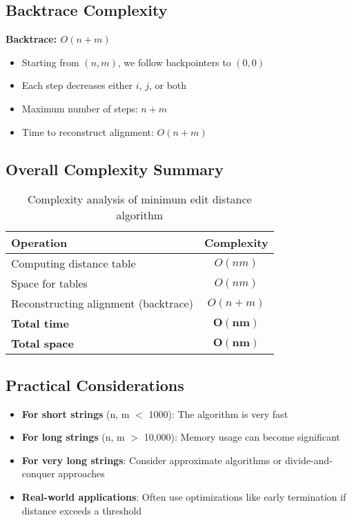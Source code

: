 \documentclass[11pt,a4paper]{article}
\theoremstyle{definition}
\theoremstyle{plain}
\theoremstyle{remark}
\begin{document}
\subsection{Backtrace Complexity}

\textbf{Backtrace: $O(n+m)$}

\begin{itemize}
    \item Starting from $(n,m)$, we follow backpointers to $(0,0)$
    \item Each step decreases either $i$, $j$, or both
    \item Maximum number of steps: $n + m$
    \item Time to reconstruct alignment: $O(n+m)$
\end{itemize}

\subsection{Overall Complexity Summary}

\begin{table}[h]
\centering
\begin{tabular}{|l|c|}
\hline
\textbf{Operation} & \textbf{Complexity} \\
\hline
Computing distance table & $O(nm)$ \\
\hline
Space for tables & $O(nm)$ \\
\hline
Reconstructing alignment (backtrace) & $O(n+m)$ \\
\hline
\textbf{Total time} & $\mathbf{O(nm)}$ \\
\hline
\textbf{Total space} & $\mathbf{O(nm)}$ \\
\hline
\end{tabular}
\caption{Complexity analysis of minimum edit distance algorithm}
\end{table}

\subsection{Practical Considerations}

\begin{itemize}
    \item \textbf{For short strings} (n, m $<$ 1000): The algorithm is very fast
    \item \textbf{For long strings} (n, m $>$ 10,000): Memory usage can become significant
    \item \textbf{For very long strings}: Consider approximate algorithms or divide-and-conquer approaches
    \item \textbf{Real-world applications}: Often use optimizations like early termination if distance exceeds a threshold
\end{itemize}
\end{document}

